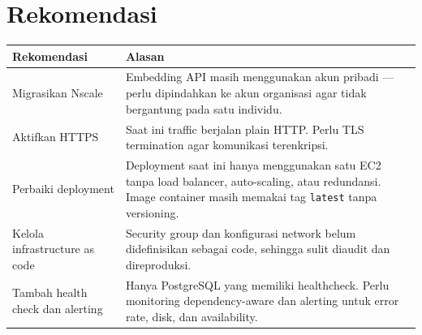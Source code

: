 \documentclass[11pt,a4paper]{article}
\begin{document}
\section{Rekomendasi}
\begin{tabularx}{\linewidth}{@{}p{4.3cm}X@{}}
\toprule \textbf{Rekomendasi} & \textbf{Alasan} \\ \midrule
Migrasikan Nscale & Embedding API masih menggunakan akun pribadi --- perlu dipindahkan ke akun organisasi agar tidak bergantung pada satu individu. \\
Aktifkan HTTPS & Saat ini traffic berjalan plain HTTP. Perlu TLS termination agar komunikasi terenkripsi. \\
Perbaiki deployment & Deployment saat ini hanya menggunakan satu EC2 tanpa load balancer, auto-scaling, atau redundansi. Image container masih memakai tag \texttt{latest} tanpa versioning. \\
Kelola infrastructure as code & Security group dan konfigurasi network belum didefinisikan sebagai code, sehingga sulit diaudit dan direproduksi. \\
Tambah health check dan alerting & Hanya PostgreSQL yang memiliki healthcheck. Perlu monitoring dependency-aware dan alerting untuk error rate, disk, dan availability. \\
\bottomrule
\end{tabularx}
\end{document}
